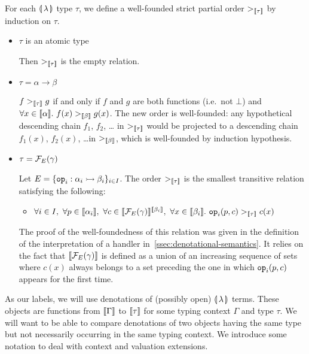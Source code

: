 \begin{definition}
  For each $\llparenthesis \, \lambda \, \rrparenthesis$ type $\tau$, we define a well-founded strict
  partial order $>_{\llbracket \tau \rrbracket}$ by induction on $\tau$.

  \begin{itemize}
  \item $\tau$ is an atomic type

    Then $>_{\llbracket \tau \rrbracket}$ is the empty relation.

  \item $\tau = \alpha \to \beta$

    $f >_{\llbracket \tau \rrbracket} g$ if and only if $f$ and $g$ are both functions
    (i.e.\ not $\bot$) and
    $\forall x \in \llbracket \alpha \rrbracket.\ f(x) >_{\llbracket \beta \rrbracket} g(x)$. The new order
    is well-founded: any hypothetical descending chain $f_1$, $f_2$, \ldots
    in $>_{\llbracket \tau \rrbracket}$ would be projected to a descending chain $f_1(x)$,
    $f_2(x)$, \ldots in $>_{\llbracket \beta \rrbracket}$, which is well-founded by
    induction hypothesis.

  \item $\tau = \mathcal{F}_E(\gamma)$

    Let $E = \{\mathtt{op}_i : \alpha_i \rightarrowtail \beta_i\}_{i \in I}$. The
    order $>_{\llbracket \tau \rrbracket}$ is the smallest transitive relation satisfying
    the following:
    \begin{itemize}
    \item
      $\forall i \in I,\ \forall p \in \llbracket \alpha_i \rrbracket,\ \forall c \in
      \llbracket \mathcal{F}_E(\gamma) \rrbracket^{\llbracket \beta_i \rrbracket},\ \forall x \in \llbracket \beta_i \rrbracket.\
      \mathtt{op}_i(p, c) >_{\llbracket \tau \rrbracket} c(x)$
    \end{itemize}
    
    The proof of the well-foundedness of this relation was given in the
    definition of the interpretation of a handler
    in~\ref{ssec:denotational-semantics}. It relies on the fact that
    $\llbracket \mathcal{F}_E(\gamma) \rrbracket$ is defined as a union of an increasing sequence
    of sets where $c(x)$ always belongs to a set preceding the one in which
    $\mathtt{op}_i(p, c)$ appears for the first time.
  \end{itemize}
\end{definition}

As our labels, we will use denotations of (possibly open)
$\llparenthesis \, \lambda \, \rrparenthesis$ terms. These objects are functions from $\llbracket \Gamma \rrbracket$
to $\llbracket \tau \rrbracket$ for some typing context $\Gamma$ and type $\tau$. We will
want to be able to compare denotations of two objects having the same type
but not necessarily occurring in the same typing context. We introduce some
notation to deal with context and valuation extensions.

